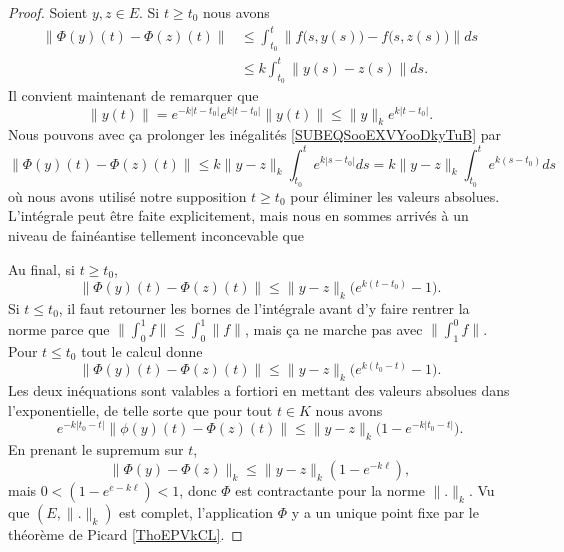 \begin{proof}
    Soient \( y,z\in E\). Si \( t\geq t_0\) nous avons
    \begin{subequations}        \label{SUBEQSooEXVYooDkyTuB}
        \begin{align}
            \| \Phi(y)(t)-\Phi(z)(t) \|&\leq \int_{t_0}^t\| f\big( s,y(s) \big)-f\big( s,z(s) \big) \|ds\\
            &\leq k\int_{t_0}^t\| y(s)-z(s) \|ds.
        \end{align}
    \end{subequations}
    Il convient maintenant de remarquer que
    \begin{equation}
        \| y(t) \|= e^{-k| t-t_0 |} e^{k| t-t_0 |}\| y(t) \|\leq \| y \|_k e^{k| t-t_0 |}.
    \end{equation}
    Nous pouvons avec ça prolonger les inégalités \eqref{SUBEQSooEXVYooDkyTuB} par
    \begin{equation}
        \| \Phi(y)(t)-\Phi(z)(t) \|\leq k\| y-z \|_k\int_{t_0}^t e^{k| s-t_0 |}ds=k\| y-z \|_k\int_{t_0}^t e^{k(s-t_0)}ds
    \end{equation}
    où nous avons utilisé notre supposition \( t\geq t_0\) pour éliminer les valeurs absolues. L'intégrale peut être faite explicitement, mais nous en sommes arrivés à un niveau de fainéantise tellement inconcevable que



Au final, si \( t\geq t_0\),
    \begin{equation}
        \| \Phi(y)(t)-\Phi(z)(t) \|\leq \| y-z \|_k\big(  e^{k(t-t_0)}-1 \big).
    \end{equation}
    Si \( t\leq t_0\), il faut retourner les bornes de l'intégrale avant d'y faire rentrer la norme parce que \( \| \int_0^1f \|\leq \int_0^1\| f \|\), mais ça ne marche pas avec \( \| \int_1^0f \|\). Pour \( t\leq t_0\) tout le calcul donne
    \begin{equation}
        \| \Phi(y)(t)-\Phi(z)(t) \|\leq \| y-z \|_k\big(  e^{k(t_0-t)}-1 \big).
    \end{equation}
    Les deux inéquations sont valables a fortiori en mettant des valeurs absolues dans l'exponentielle, de telle sorte que pour tout \( t\in K\) nous avons
    \begin{equation}
        e^{-k| t_0-t |}\| \phi(y)(t)-\Phi(z)(t) \|\leq \| y-z \|_k\big( 1- e^{-k| t_0-t |} \big).
    \end{equation}
    En prenant le supremum sur \( t\),
    \begin{equation}
        \| \Phi(y)-\Phi(z) \|_k\leq \| y-z \|_k(1- e^{-k\ell}),
    \end{equation}
    mais \( 0<(1- e^{e-k\ell})<1\), donc \( \Phi\) est contractante pour la norme \( \| . \|_k\). Vu que \( (E,\| . \|_k)\) est complet, l'application \( \Phi\) y a un unique point fixe par le théorème de Picard \ref{ThoEPVkCL}.


\end{proof}
